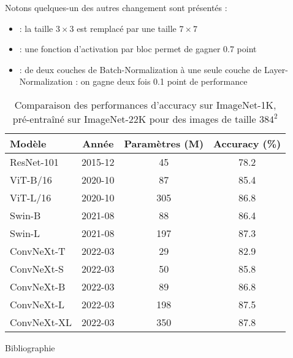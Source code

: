 \documentclass{beamer}
\begin{document}
\begin{frame}{}{}
	Notons quelques-un des autres changement sont présentés :
	\begin{itemize}
		\item {}: la taille $3\times3$ est remplacé par une taille $7\times7$
		\item {}: une fonction d'activation par bloc permet de gagner 0.7 point
		\item {}: de deux couches de Batch-Normalization à une seule couche de Layer-Normalization : on gagne deux fois 0.1 point de performance
	\end{itemize}
	
	\begin{table}[h!]
		\begin{center}
			\begin{tabular}{@{}lccc}\toprule
				Modèle & Année & Paramètres (M)& Accuracy (\%) \\\midrule
				ResNet-101 & 2015-12 & 45 & 78.2\\[0.2cm]
				ViT-B/16 & 2020-10 & 87 & 85.4\\
				ViT-L/16 & 2020-10 & 305 & 86.8\\[0.2cm]
				Swin-B & 2021-08 & 88 & 86.4\\
				Swin-L & 2021-08 & 197 & 87.3\\[0.2cm]
				ConvNeXt-T & 2022-03 & 29 & 82.9\\
				ConvNeXt-S & 2022-03 & 50 & 85.8\\
				ConvNeXt-B & 2022-03 & 89 & 86.8\\
				ConvNeXt-L & 2022-03 & 198 & 87.5\\
				ConvNeXt-XL & 2022-03 & 350 & 87.8\\\bottomrule
			\end{tabular}
		\end{center}
		\caption{Comparaison des performances d'accuracy sur ImageNet-1K, pré-entraîné sur ImageNet-22K pour des images de taille $384^2$}
	\end{table}
\end{frame}


\begin{frame}[allowframebreaks]{Bibliographie}
	
	
\end{frame}



\appendix
\end{document}
